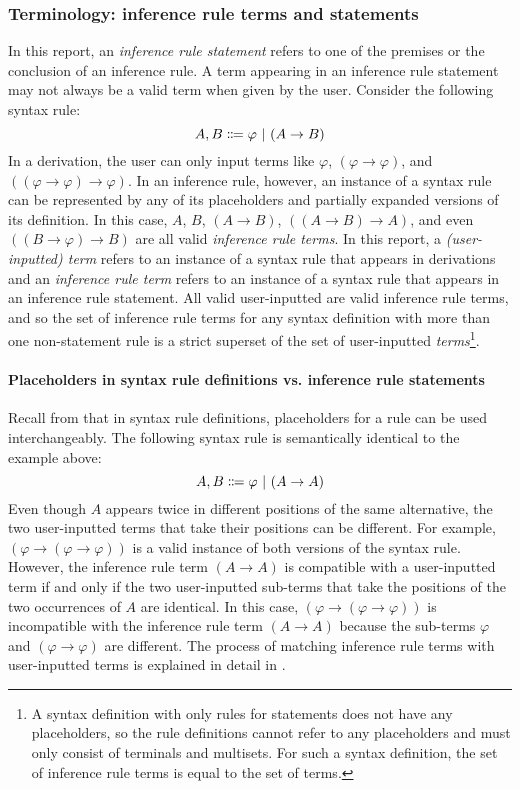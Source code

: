 \subsubsection{Terminology: inference rule terms and statements}
In this report, an \textit{inference rule statement} refers to one of the premises or the conclusion of an inference rule. A term appearing in an inference rule statement may not always be a valid term when given by the user. Consider the following syntax rule:
\[
    A, B \Coloneqq \varphi \ |\  (A \to B)
\]
In a derivation, the user can only input terms like $\varphi$, $(\varphi \to \varphi)$, and $((\varphi \to \varphi) \to \varphi)$. In an inference rule, however, an instance of a syntax rule can be represented by any of its placeholders and partially expanded versions of its definition. In this case, $A$, $B$, $(A \to B)$, $((A \to B) \to A)$, and even $((B \to \varphi) \to B)$ are all valid \textit{inference rule terms}. In this report, a \textit{(user-inputted) term} refers to an instance of a syntax rule that appears in derivations and an \textit{inference rule term} refers to an instance of a syntax rule that appears in an inference rule statement. All valid user-inputted are valid inference rule terms, and so the set of inference rule terms for any syntax definition with more than one non-statement rule is a strict superset of the set of user-inputted \textit{terms}\footnote{A syntax definition with only rules for statements does not have any placeholders, so the rule definitions cannot refer to any placeholders and must only consist of terminals and multisets. For such a syntax definition, the set of inference rule terms is equal to the set of terms.}.

\paragraph{Placeholders in syntax rule definitions vs. inference rule statements}
Recall from  that in syntax rule definitions, placeholders for a rule can be used interchangeably. The following syntax rule is semantically identical to the example above:
\[
    A, B \Coloneqq \varphi \ |\  (A \to A)
\]
Even though $A$ appears twice in different positions of the same alternative, the two user-inputted terms that take their positions can be different. For example, $(\varphi \to (\varphi \to \varphi))$ is a valid instance of both versions of the syntax rule. However, the inference rule term $(A \to A)$ is compatible with a user-inputted term if and only if the two user-inputted sub-terms that take the positions of the two occurrences of $A$ are identical. In this case, $(\varphi \to (\varphi \to \varphi))$ is incompatible with the inference rule term $(A \to A)$ because the sub-terms $\varphi$ and $(\varphi \to \varphi)$ are different. The process of matching inference rule terms with user-inputted terms is explained in detail in .

